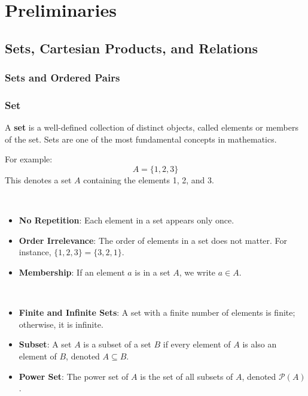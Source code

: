 \appendix
\chapter{Preliminaries}
\section{Sets, Cartesian Products, and Relations}

\subsection{Sets and Ordered Pairs}

\subsection*{Set}

A \textbf{set} is a well-defined collection of distinct objects, called elements or members of the set. Sets are one of the most fundamental concepts in mathematics.

\begin{example}
For example:
\[
A = \{1, 2, 3\}
\]
This denotes a set \(A\) containing the elements 1, 2, and 3.
\end{example}
\vspace{12pt}
\begin{note}[Properties]
\ \begin{itemize}
	\item \textbf{No Repetition}: Each element in a set appears only once.
	\item \textbf{Order Irrelevance}: The order of elements in a set does not matter. For instance, \(\{1, 2, 3\} = \{3, 2, 1\}\).
	\item \textbf{Membership}: If an element \(a\) is in a set \(A\), we write \(a \in A\).
\end{itemize}
\end{note}
\vspace{12pt}
\begin{note}
\ \begin{itemize}
	\item \textbf{Finite and Infinite Sets}: A set with a finite number of elements is finite; otherwise, it is infinite.
	\item \textbf{Subset}: A set \(A\) is a subset of a set \(B\) if every element of \(A\) is also an element of \(B\), denoted \(A \subseteq B\).
	\item \textbf{Power Set}: The power set of \(A\) is the set of all subsets of \(A\), denoted \(\mathcal{P}(A)\).
\end{itemize}
\end{note}

